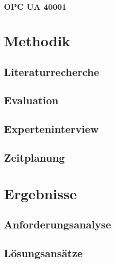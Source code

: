 \documentclass[a4paper, 12pt, oneside]{scrbook}
\begin{document}
		\subsection{OPC UA 40001}
		
		
	
\chapter{Methodik}
	
	
	
	\section{Literaturrecherche}
	
	\section{Evaluation}
	
	\section{Experteninterview}
	
	\section{Zeitplanung}
	
\chapter{Ergebnisse}
	
	
	\section{Anforderungsanalyse}
	
	\section{Lösungsansätze}
		
\end{document}
